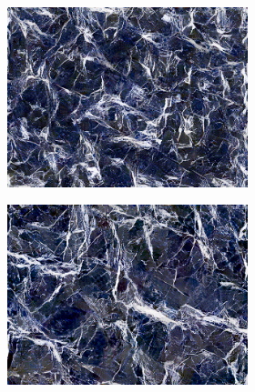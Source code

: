 \begin{figure}[]
\begin{subfigure}{\textwidth}
\begin{subfigure}{0.19\textwidth}
        \end{subfigure}
        \hfill
        \begin{subfigure}{0.19\textwidth}
            \centering
            \includegraphics[width=\textwidth]{images/04-experiment02/isolating_issues/255_gatys.jpg}
            \caption*{}
        \end{subfigure}
        \hfill
        \begin{subfigure}{0.19\textwidth}
            \centering
            \includegraphics[width=\textwidth]{images/04-experiment02/isolating_issues/255_improved.jpg}
            \caption*{}

\end{subfigure}
\end{subfigure}
\end{figure}
